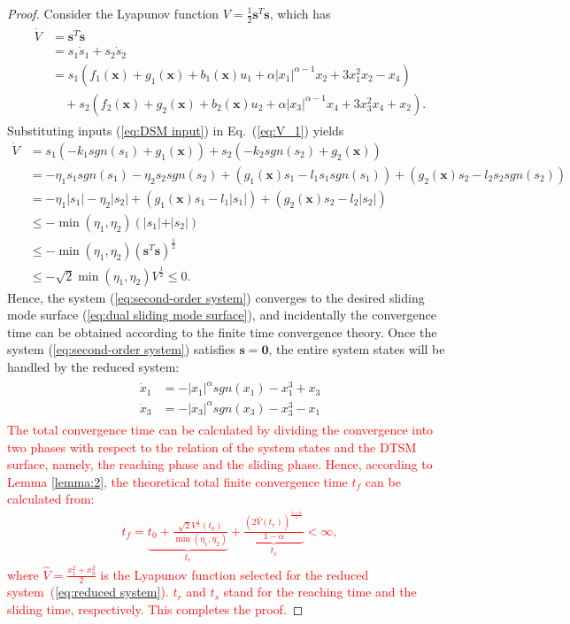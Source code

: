 \documentclass[3p]{elsarticle}
\theoremstyle{plain}
\theoremstyle{remark}
\begin{document}
\begin{proof}
Consider the Lyapunov function $V=\frac{1}{2}{\bm s}^T\bm s$, which has
\begin{align}
\begin{split}
\dot V &= {\bm s}^T\dot{\bm  s}\\
&=s_1\dot s_1+s_2\dot s_2\\
&=s_1(f_1(\bm x)+g_1(\bm x)+b_1(\bm x)u_1+\alpha\vert x_1\vert^{\alpha-1}x_2+3x_1^2x_2-x_4)\\
&\quad +s_2(f_2(\bm x)+g_2(\bm x)+b_2(\bm x)u_2+\alpha\vert x_3\vert^{\alpha-1}x_4+3x_3^2x_4+x_2).\label{eq:V_1}
\end{split}
\end{align}
Substituting inputs (\ref{eq:DSM input}) in Eq.~(\ref{eq:V_1}) yields
\begin{align*}
\dot V &= s_1(-k_1sgn(s_1)+g_1(\bm x))+s_2(-k_2sgn(s_2)+g_2(\bm x))\\
&= -\eta_1s_1sgn(s_1)-\eta_2s_2sgn(s_2)+(g_1(\bm x)s_1 - l_1s_1sgn(s_1))+(g_2(\bm x)s_2 - l_2s_2sgn(s_2))\\
&= -\eta_1\vert s_1\vert-\eta_2\vert s_2\vert+(g_1(\bm x)s_1 - l_1\vert s_1\vert)+(g_2(\bm x)s_2 - l_2\vert s_2\vert)\\
&\le - \min(\eta_1,\eta_2)(\vert s_1\vert+\vert s_2\vert)\\
&\le -\min(\eta_1,\eta_2)({\bm s}^T\bm s)^\frac{1}{2}\\
&\le -\sqrt{2}\min(\eta_1,\eta_2)V^\frac{1}{2}\le 0.
\end{align*}
Hence, the system (\ref{eq:second-order system}) converges to the desired sliding mode  surface (\ref{eq:dual sliding mode  surface}), and incidentally the convergence time can be obtained according to the finite time convergence theory. Once the system (\ref{eq:second-order system}) satisfies $\bm s = \bm 0$, the entire system states will be handled by the reduced system:
\begin{align}
  \begin{split}
\dot x_1&=-\vert x_1\vert^\alpha sgn(x_1)-x_1^3+x_3\\
\dot x_3&=-\vert x_3\vert^\alpha sgn(x_3)-x_3^3-x_1\label{eq:reduced system}
\end{split}
\end{align}
\textcolor{red}{The total convergence time can be calculated by dividing the convergence into two phases with respect to the relation of the system states and the DTSM surface, namely, the reaching phase and the sliding phase. Hence, according to Lemma \ref{lemma:2}, the theoretical total finite convergence time $t_f$ can be calculated from:
\begin{align}
t_f = \underbrace{t_0+\frac{\sqrt{2}V^{\frac{1}{2}}(t_0)}{\min(\eta_1,\eta_2)}}_{t_r}+\underbrace{\frac{(2\hat V(t_r))^{\frac{1-\alpha}{2}}}{1-\alpha}}_{t_s}<\infty,
\end{align}
where $\hat V = \frac{x_1^2+x_3^2}{2}$ is the Lyapunov function selected for the reduced system~(\ref{eq:reduced system}). $t_r$ and $t_s$ stand for the reaching time and the sliding time, respectively. This completes the proof.}
\end{proof}
\end{document}
